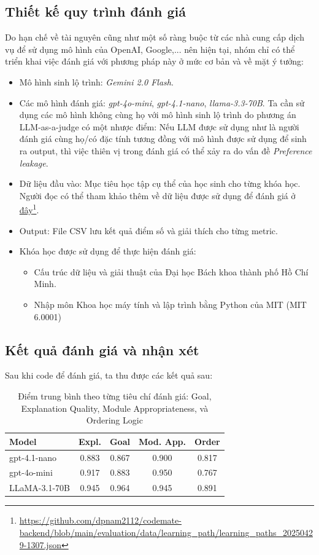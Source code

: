 \subsection{Thiết kế quy trình đánh giá}
Do hạn chế về tài nguyên cũng như một số ràng buộc từ các nhà cung cấp dịch vụ để sử dụng mô hình của OpenAI, Google,... nên hiện tại, nhóm chỉ có thể triển khai việc đánh giá với phương pháp này ở mức cơ bản và về mặt ý tưởng:
\begin{itemize}
    \item Mô hình sinh lộ trình: \emph{Gemini 2.0 Flash}.
    \item Các mô hình đánh giá: \emph{gpt-4o-mini}, \emph{gpt-4.1-nano}, \emph{llama-3.3-70B}. Ta cần sử dụng các mô hình không cùng họ với mô hình sinh lộ trình do phương án LLM-as-a-judge có một nhược điểm: Nếu LLM được sử dụng như là người đánh giá cùng họ/có đặc tính tương đồng với mô hình được sử dụng để sinh ra output, thì việc thiên vị trong đánh giá có thể xảy ra do vấn đề \emph{Preference leakage}.
    \item Dữ liệu đầu vào: Mục tiêu học tập cụ thể của học sinh cho từng khóa học. Người đọc có thể tham khảo thêm về dữ liệu được sử dụng để đánh giá ở \href{https://github.com/dpnam2112/codemate-backend/blob/main/evaluation/data/learning_path/learning_paths_20250429-1307.json}{đây}\footnote{\url{https://github.com/dpnam2112/codemate-backend/blob/main/evaluation/data/learning_path/learning_paths_20250429-1307.json}}.
    \item Output: File CSV lưu kết quả điểm số và giải thích cho từng metric.
    \item Khóa học được sử dụng để thực hiện đánh giá:
    \begin{itemize}
        \item Cấu trúc dữ liệu và giải thuật của Đại học Bách khoa thành phố Hồ Chí Minh.
        \item Nhập môn Khoa học máy tính và lập trình bằng Python của MIT (MIT 6.0001)
    \end{itemize}
\end{itemize}

\subsection{Kết quả đánh giá và nhận xét}

Sau khi code để đánh giá, ta thu được các kết quả sau:
\begin{table}[h!]
\centering
\begin{tabular}{lcccc}
\toprule
\textbf{Model} & \textbf{Expl.} & \textbf{Goal} & \textbf{Mod. App.} & \textbf{Order} \\
\midrule
gpt-4.1-nano & 0.883 & 0.867 & 0.900 & 0.817 \\
gpt-4o-mini  & 0.917 & 0.883 & 0.950 & 0.767 \\
LLaMA-3.1-70B & 0.945 & 0.964 & 0.945 & 0.891 \\
\bottomrule
\end{tabular}
\caption{Điểm trung bình theo từng tiêu chí đánh giá: Goal, Explanation Quality, Module Appropriateness, và Ordering Logic}
\label{tab:avg_scores_abbr}
\end{table}

